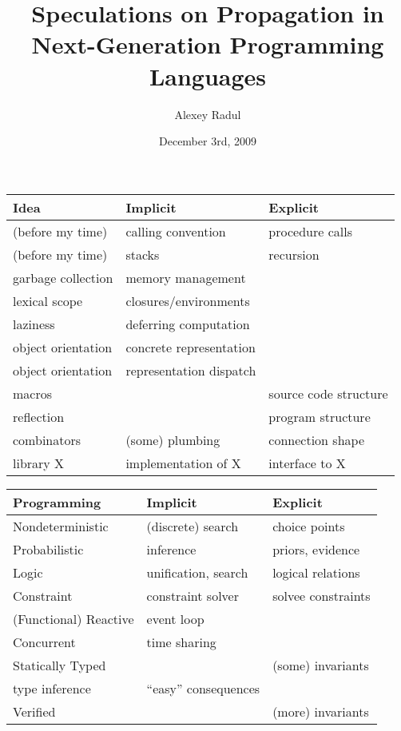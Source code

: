\documentclass{beamer}
\title[Speculations on Propagation]{Speculations on Propagation in\\Next-Generation Programming Languages}
\author{Alexey Radul}
\date{December 3rd, 2009}
\newenvironment{mytable}[1]{\begin{tabular}{l|l|l}
{{#1}} & Implicit & Explicit \\ \hline \hline
}{\end{tabular}}
\begin{document}
\begin{frame}
\maketitle
\end{frame}

\begin{frame}
\begin{mytable}{Idea}
(before my time) & calling convention & procedure calls \\
(before my time) & stacks & recursion \\
garbage collection & memory management & \\
lexical scope & closures/environments & \\
laziness & deferring computation & \\
object orientation & concrete representation & \\
object orientation & representation dispatch & \\
macros & & source code structure \\
reflection & & program structure \\
combinators & (some) plumbing & connection shape \\
library X & implementation of X & interface to X \\
\end{mytable}
\end{frame}

\begin{frame}
\begin{mytable}{\underline{\hspace*{1cm}} Programming}
Nondeterministic & (discrete) search & choice points \\
Probabilistic & inference & priors, evidence \\
Logic & unification, search & logical relations \\
Constraint & constraint solver & solvee constraints \\
(Functional) Reactive & event loop & \\
Concurrent & time sharing & \\
Statically Typed & & (some) invariants \\
type inference & ``easy'' consequences & \\
Verified & & (more) invariants \\
\end{mytable}
\end{frame}
\end{document}
